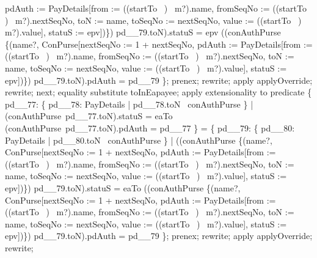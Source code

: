 \begin{LPScript}
\begin{zproof}[lPromotedAuxWorldStartToType]
                pdAuth := \theta PayDetails[from := ((startTo~ \inv)~ m?).name,
                    fromSeqNo := ((startTo~ \inv)~ m?).nextSeqNo, 
                    toN := name, toSeqNo := nextSeqNo,
                    value := ((startTo~ \inv)~ m?).value],
                statuS := epv])\}) pd\_\_79.toN).statuS = epv
              \land ((conAuthPurse \oplus \{(name?, \theta ConPurse[nextSeqNo := 1 + nextSeqNo,
                pdAuth := \theta PayDetails[from := ((startTo~ \inv)~ m?).name,
                    fromSeqNo := ((startTo~ \inv)~ m?).nextSeqNo, 
                    toN := name, toSeqNo := nextSeqNo,
                    value := ((startTo~ \inv)~ m?).value],
                statuS := epv])\}) pd\_\_79.toN).pdAuth = pd\_\_79 \};
        prenex;
        rewrite;
        apply applyOverride;
        rewrite;
    next;
        equality substitute toInEapayee;
        apply extensionality to predicate
            \{ pd\_\_77: \{ pd\_\_78: PayDetails | pd\_\_78.toN \in \dom~conAuthPurse \}
              | (conAuthPurse~pd\_\_77.toN).statuS = eaTo
             \land (conAuthPurse~pd\_\_77.toN).pdAuth = pd\_\_77 \}
            = \{ pd\_\_79: \{ pd\_\_80: PayDetails | pd\_\_80.toN \in \dom~conAuthPurse \}
              | ((conAuthPurse \oplus \{(name?, \theta ConPurse[nextSeqNo := 1 + nextSeqNo,
                pdAuth := \theta PayDetails[from := ((startTo~ \inv)~ m?).name,
                    fromSeqNo := ((startTo~ \inv)~ m?).nextSeqNo, 
                    toN := name, toSeqNo := nextSeqNo,
                    value := ((startTo~ \inv)~ m?).value],
                statuS := epv])\}) pd\_\_79.toN).statuS = eaTo
              \land ((conAuthPurse \oplus \{(name?, \theta ConPurse[nextSeqNo := 1 + nextSeqNo,
                pdAuth := \theta PayDetails[from := ((startTo~ \inv)~ m?).name,
                    fromSeqNo := ((startTo~ \inv)~ m?).nextSeqNo, 
                    toN := name, toSeqNo := nextSeqNo,
                    value := ((startTo~ \inv)~ m?).value],
                statuS := epv])\}) pd\_\_79.toN).pdAuth = pd\_\_79 \};
        prenex;
        rewrite;
        apply applyOverride;
        rewrite;

\end{zproof}
\end{LPScript}

